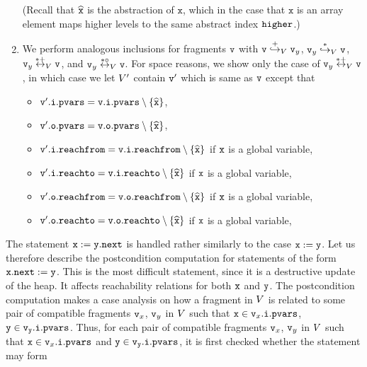\begin{enumerate}
\begin{itemize}
\end{itemize}
  (Recall that $\widehat{\mathtt{x}}$ is the abstraction of $\mathtt{x}$, which
  in the case that $\mathtt{x}$ is an array element
  maps higher levels to the same   abstract index $\tt higher$.)
\item We perform analogous inclusions for fragments $\mathtt{v}$ with
  $\mathtt{v} \overset{+}\hookrightarrow_{V} \mathtt{v}_y$,
  $\mathtt{v}_y \overset{*}\hookrightarrow_{V} \mathtt{v}$,
  $\mathtt{v}_y \overset{*+}\leftrightarrow_{V} \mathtt{v}$, and
  $\mathtt{v}_y \overset{*\circ}\leftrightarrow_{V} \mathtt{v}$. For space reasons,
  we show only the case of $\mathtt{v}_y \overset{*+}\leftrightarrow_{V} \mathtt{v}$,
  in which case we let $V'$ contain $\mathtt{v}'$ which is same as $\mathtt{v}$ except that
\begin{itemize}
\item $\mathtt{v}'.\mathtt{i}.\mathtt{pvars} = \mathtt{v}.\mathtt{i}.\mathtt{pvars} \setminus \left\{\widehat{\mathtt{x}}\right\}$,
\item $\mathtt{v}'.\mathtt{o}.\mathtt{pvars} = \mathtt{v}.\mathtt{o}.\mathtt{pvars} \setminus \left\{\widehat{\mathtt{x}}\right\}$,
\item $\mathtt{v}'.\mathtt{i}.\mathtt{reachfrom} = \mathtt{v}.\mathtt{i}.\mathtt{reachfrom} \setminus \left\{\widehat{\mathtt{x}}\right\}$ if $\tt x$ is a global variable,
\item $\mathtt{v}'.\mathtt{i}.\mathtt{reachto} = \mathtt{v}.\mathtt{i}.\mathtt{reachto} \setminus \left\{\widehat{\mathtt{x}}\right\}$ if $\tt x$ is a global variable,
\item $\mathtt{v}'.\mathtt{o}.\mathtt{reachfrom} = \mathtt{v}.\mathtt{o}.\mathtt{reachfrom} \setminus \left\{\widehat{\mathtt{x}}\right\}$ if $\tt x$ is a global variable,
\item $\mathtt{v}'.\mathtt{o}.\mathtt{reachto} = \mathtt{v}.\mathtt{o}.\mathtt{reachto} \setminus \left\{\widehat{\mathtt{x}}\right\}$ if $\tt x$ is a global variable,
\end{itemize}
\end{enumerate}
The statement ${\tt x := y.next}$ is handled rather similarly to the 
case ${\tt x := y}$.
Let us therefore describe the postcondition computation for statements of the form
${\tt x.next:= y}$.
This is the most difficult statement, since it is a destructive update of the heap. It affects reachability relations for both $\mathtt{x}$ and $\mathtt{y}$.
The postcondition computation makes a case analysis on how a fragment
in $V$ is related to some pair of compatible fragments $\mathtt{v}_x$, $\mathtt{v}_y$ in $V$ such that $\mathtt{x} \in \mathtt{v}_x.\mathtt{i}.\mathtt{pvars}$, $\tt y \in \mathtt{v}_y.\mathtt{i}.\mathtt{pvars}$. 
Thus, for each pair of compatible fragments $\mathtt{v}_x$, $\mathtt{v}_y$ in $V$ such that $\mathtt{x} \in \mathtt{v}_x.\mathtt{i}.\mathtt{pvars}$ and $\tt y \in \mathtt{v}_y.\mathtt{i}.\mathtt{pvars}$, it is first checked whether the statement may form
